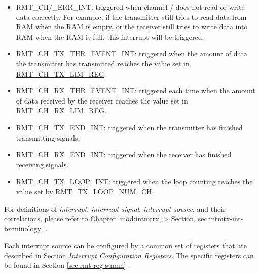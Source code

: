 \documentclass[main\_\_EN.tex]{subfiles}
\begin{document}
\begin{itemize}
\item \label{int:RMTCHNERRINT}RMT\_CH/\_ERR\_INT: triggered when channel / does not read or write data correctly. For example, if the transmitter still tries to read data from RAM when the RAM is empty, or the receiver still tries to write data into RAM when the RAM is full, this interrupt will be triggered.    
\item \label{int:RMTCHNTXTHREVENTINT}RMT\_CH\_TX\_THR\_EVENT\_INT: triggered when the amount of data the transmitter has transmitted reaches the value set in \hyperref[regdesc:RMTCHNTXLIMREG]{RMT\_CH\_TX\_LIM\_REG}.
\item \label{int:RMTCHMRXTHREVENTINT}RMT\_CH\_RX\_THR\_EVENT\_INT: triggered each time when the amount of data received by the receiver reaches the value set in \hyperref[regdesc:RMTCHMRXLIMREG]{RMT\_CH\_RX\_LIM\_REG}. 
\item \label{int:RMTCHNTXENDINT}RMT\_CH\_TX\_END\_INT: triggered when the transmitter has finished transmitting signals.
\item \label{int:RMTCHMRXENDINT}RMT\_CH\_RX\_END\_INT: triggered when the receiver has finished receiving signals.
\item \label{int:RMTCHNTXLOOPINT}RMT\_CH\_TX\_LOOP\_INT: triggered when the loop counting reaches the value set by  \hyperref[fielddesc:RMTTXLOOPNUMCHN]{RMT\_TX\_LOOP\_NUM\_CH}.
\end{itemize}


\begin{tiplisting}
For definitions of \textit{interrupt}, \textit{interrupt signal}, \textit{interrupt source}, and their correlations, please refer to Chapter \ref{mod:intmtrx} \textit{} > Section \ref{sec:intmtx-int-terminology} \textit{}.
\end{tiplisting}

Each interrupt source can be configured by a common set of registers that are described in Section \hyperref[interrupt-config-registers]{\textit{Interrupt Configuration Registers}}. The specific registers can be found in Section \ref{sec:rmt-reg-summ} \textit{}.


\end{document}
